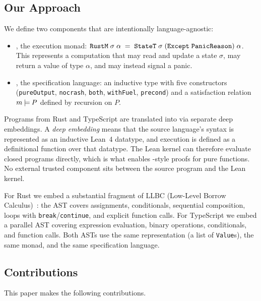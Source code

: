 \subsection{Our Approach}

We define two components that are intentionally language-agnostic:

\begin{itemize}[leftmargin=1.5em]
  \item \textbf{\RustM}, the execution monad:
        $\texttt{RustM}\;\sigma\;\alpha \;=\; \texttt{StateT}\;\sigma\;(\texttt{Except}\;\texttt{PanicReason})\;\alpha$.
        This represents a computation that may read and update a state $\sigma$,
        may return a value of type $\alpha$, and may instead signal a panic.

  \item \textbf{\ProgramSpec}, the specification language: an inductive type with
        five constructors (\texttt{pureOutput}, \texttt{nocrash}, \texttt{both},
        \texttt{withFuel}, \texttt{precond}) and a satisfaction relation
        $m \mathbin{\models} P$ defined by recursion on $P$.
\end{itemize}

Programs from Rust and TypeScript are translated into \RustM via separate deep
embeddings. A \emph{deep embedding} means that the source language's syntax is
represented as an inductive Lean~4 datatype, and execution is defined as a
definitional function over that datatype. The Lean kernel can therefore evaluate
closed programs directly, which is what enables \rfl-style proofs for pure
functions. No external trusted component sits between the source program and
the Lean kernel.

For Rust we embed a substantial fragment of LLBC (Low-Level Borrow
Calculus)~\cite{charon2024}: the AST covers assignments, conditionals,
sequential composition, loops with \texttt{break}/\texttt{continue},
and explicit function calls. For TypeScript we embed a parallel AST covering
expression evaluation, binary operations, conditionals, and function calls.
Both ASTs use the same \Locals representation (a list of \texttt{Value}s),
the same \RustM monad, and the same \ProgramSpec specification language.

\subsection{Contributions}

This paper makes the following contributions.

